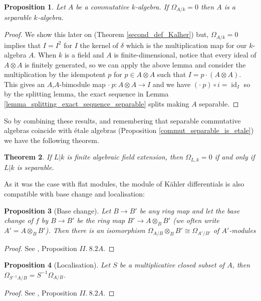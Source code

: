 \documentclass{article}
\theoremstyle{plain}
\newtheorem{theorem}{Theorem}[subsection]
\newtheorem{proposition}[theorem]{Proposition}
\theoremstyle{definition}
\DeclareMathOperator{\id}{id}
\begin{document}
\begin{proposition}
    Let $A$ be a commutative $k$-algebra. If $\Omega_{A/k} = 0$ then $A$ is a separable $k$-algebra.
\end{proposition}
\begin{proof}
    We show this later on (Theorem \ref{second_def_Kalher}) but, $\Omega_{A/k} = 0$ implies that $I = I^2$ for $I$ the kernel of $\delta$ which is the multiplication map for our $k$-algebra $A$.
    When $k$ is a field and $A$ is finite-dimensional, notice that every ideal of $A\otimes A$ is finitely generated, so we can apply the above lemma and consider the multiplication by the idempotent $p$ for $p\in A\otimes A$ such that $I = p\cdot (A\otimes A)$.
    This gives an $A$,$A$-bimodule map $\cdot\: p: A\otimes A\rightarrow I$ and we have $(\cdot \:p)\circ i = \id_I$ so by the splitting lemma, the exact sequence in Lemma \ref{lemma_splitting_exact_sequence_separable} splits making $A$ separable.
\end{proof}


\noindent So by combining these results, and remembering that separable commutative algebras coincide with \'etale algebras (Proposition \ref{commut_separable_is_etale}) we have the following theorem.

\begin{theorem}
\label{separable_zero_kahler}
    If $L|k$ is finite algebraic field extension, then $\Omega_{L,k}=0$ if and only if $L|k$ is separable.
\end{theorem}


\noindent As it was the case with flat modules, the module of K\"ahler differentials is also compatible with base change and localisation:


\begin{proposition}[Base change]
\label{Base_change_kahler_module}
    Let $B\rightarrow B'$ be any ring map and let the base change of $f$ by $B\rightarrow B'$ be the ring map $B'\rightarrow A\otimes_B B'$ (we often write $A' = A\otimes_B B'$).
    Then there is an isomorphism $\Omega_{A/B}\otimes_B B'\cong \Omega_{A'/B'}$ of $A'$-modules
\end{proposition}
\begin{proof}
    See \cite{Hartshorne}, Proposition $II.\: 8.2A$.
\end{proof}



\begin{proposition}[Localisation]
\label{localization_kahler_module}
    Let $S$ be a multiplicative closed subset of $A$, then $\Omega_{S^{-1}A/B} = S^{-1}\Omega_{A/B}$.
\end{proposition}
\begin{proof}
    See \cite{Hartshorne}, Proposition $II.\: 8.2A$.
\end{proof}
\end{document}
